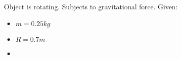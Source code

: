 

Object is rotating. Subjects to gravitational force.
Given: 

\begin{itemize}
    \item $  m  = 0.25kg $
    \item $ R = 0.7m $
    \item 
\end{itemize}
